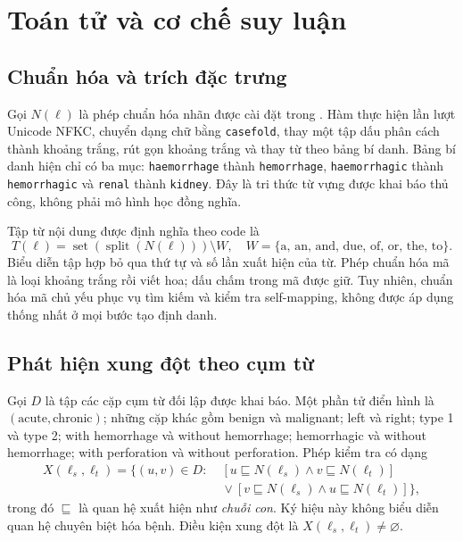 \chapter{Toán tử và cơ chế suy luận}\label{chap:reasoning}

\section{Chuẩn hóa và trích đặc trưng}
Gọi $N(\ell)$ là phép chuẩn hóa nhãn được cài đặt trong
. Hàm thực hiện lần lượt Unicode NFKC, chuyển dạng chữ
bằng \texttt{casefold}, thay một tập dấu phân cách thành khoảng trắng,
rút gọn khoảng trắng và thay từ theo bảng bí danh.
Bảng bí danh hiện chỉ có ba mục: \texttt{haemorrhage} thành
\texttt{hemorrhage}, \texttt{haemorrhagic} thành \texttt{hemorrhagic}
và \texttt{renal} thành \texttt{kidney}.
Đây là tri thức từ vựng được khai báo thủ công, không phải mô hình học đồng nghĩa.

Tập từ nội dung được định nghĩa theo code là
\begin{equation}
  T(\ell)=\operatorname{set}(\operatorname{split}(N(\ell)))\setminus W,
  \quad
  W=\{\text{a, an, and, due, of, or, the, to}\}.
  \label{eq:tokens}
\end{equation}
Biểu diễn tập hợp bỏ qua thứ tự và số lần xuất hiện của từ.
Phép chuẩn hóa mã là loại khoảng trắng rồi viết hoa; dấu chấm trong mã
được giữ. Tuy nhiên, chuẩn hóa mã chủ yếu phục vụ tìm kiếm và kiểm tra
self-mapping, không được áp dụng thống nhất ở mọi bước tạo định danh.

\section{Phát hiện xung đột theo cụm từ}
Gọi $D$ là tập các cặp cụm từ đối lập được khai báo.
Một phần tử điển hình là $(\text{acute},\text{chronic})$;
những cặp khác gồm benign và malignant; left và right; type 1 và type 2;
with hemorrhage và without hemorrhage; hemorrhagic và without hemorrhage;
with perforation và without perforation.
Phép kiểm tra có dạng
\begin{equation}
\begin{split}
X(\ell_s,\ell_t)=\{(u,v)\in D:\;&
[u\sqsubseteq N(\ell_s)\land v\sqsubseteq N(\ell_t)]\\
&{}\lor[v\sqsubseteq N(\ell_s)\land u\sqsubseteq N(\ell_t)]\},
\end{split}
\label{eq:conflict}
\end{equation}
trong đó $\sqsubseteq$ là quan hệ xuất hiện như \emph{chuỗi con}.
Ký hiệu này không biểu diễn quan hệ chuyên biệt hóa bệnh.
Điều kiện xung đột là $X(\ell_s,\ell_t)\ne\varnothing$.


